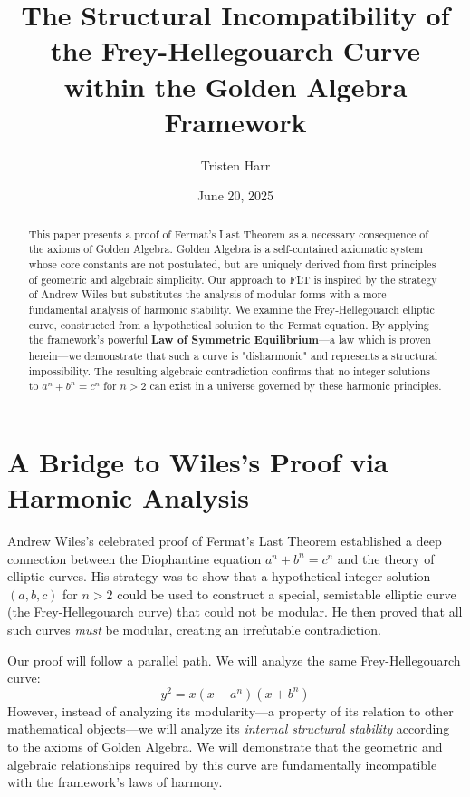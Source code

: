 \documentclass{amsart}
\theoremstyle{plain}
\theoremstyle{definition}
\theoremstyle{remark}
\begin{document}
\title{The Structural Incompatibility of the Frey-Hellegouarch Curve within the Golden Algebra Framework}
\author{Tristen Harr}
\date{June 20, 2025}

\begin{abstract}
This paper presents a proof of Fermat's Last Theorem as a necessary consequence of the axioms of Golden Algebra. Golden Algebra is a self-contained axiomatic system whose core constants are not postulated, but are uniquely derived from first principles of geometric and algebraic simplicity. Our approach to FLT is inspired by the strategy of Andrew Wiles but substitutes the analysis of modular forms with a more fundamental analysis of harmonic stability. We examine the Frey-Hellegouarch elliptic curve, constructed from a hypothetical solution to the Fermat equation. By applying the framework's powerful \textbf{Law of Symmetric Equilibrium}—a law which is proven herein—we demonstrate that such a curve is "disharmonic" and represents a structural impossibility. The resulting algebraic contradiction confirms that no integer solutions to $a^n + b^n = c^n$ for $n>2$ can exist in a universe governed by these harmonic principles.
\end{abstract}

\maketitle

\section{A Bridge to Wiles's Proof via Harmonic Analysis}

Andrew Wiles's celebrated proof of Fermat's Last Theorem established a deep connection between the Diophantine equation $a^n + b^n = c^n$ and the theory of elliptic curves. His strategy was to show that a hypothetical integer solution $(a, b, c)$ for $n>2$ could be used to construct a special, semistable elliptic curve (the Frey-Hellegouarch curve) that could not be modular. He then proved that all such curves \emph{must} be modular, creating an irrefutable contradiction.

Our proof will follow a parallel path. We will analyze the same Frey-Hellegouarch curve:
\begin{equation}
    y^2 = x(x - a^n)(x + b^n)
\end{equation}
However, instead of analyzing its modularity—a property of its relation to other mathematical objects—we will analyze its \emph{internal structural stability} according to the axioms of Golden Algebra. We will demonstrate that the geometric and algebraic relationships required by this curve are fundamentally incompatible with the framework's laws of harmony.
\end{document}

